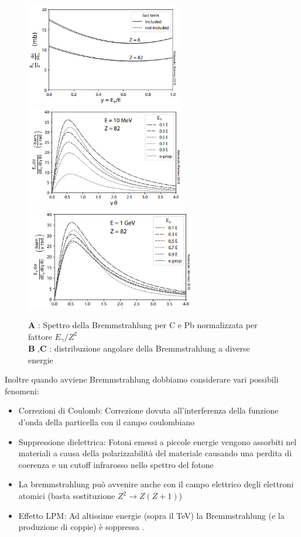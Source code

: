 \begin{figure}[H]
    \centering
    \includegraphics[height=4.5cm,frame]{Chapters/images/Interazione_radiazione_materia/image-20220220135143452.png}
    \includegraphics[height=4.5cm,frame]{Chapters/images/Interazione_radiazione_materia/image-20220220135223580.png}
    \includegraphics[height=4.5cm,frame]{Chapters/images/Interazione_radiazione_materia/image-20220220135322598.png}
    \captionsetup{width=0.9\linewidth}
    \caption{\textbf{A} : Spettro della Bremmstrahlung per C e Pb normalizzata per fattore $E_\gamma/Z^2$ \\ \textbf{B} ,\textbf{C} : distribuzione angolare della Bremmstrahlung a diverse energie}
    \label{fig:}
\end{figure}
Inoltre quando avviene Bremmstrahlung dobbiamo considerare vari possibili fenomeni:
\begin{itemize}
    \item Correzioni di Coulomb: Correzione dovuta all'interferenza della funzione d'onda della particella con il campo coulombiano

\item Suppressione dielettrica: Fotoni emessi a piccole energie vengono assorbiti nel materiali a causa della polarizzabilità del materiale causando una perdita di coerenza e un cutoff infrarosso nello spettro del fotone

\item La bremmstrahlung può avvenire anche con il campo elettrico degli elettroni atomici (basta sostituzione $Z^2 \to Z(Z+1)$)

\item Effetto LPM: Ad altissime energie (sopra il TeV) la Bremmstrahlung (e la produzione di coppie) è soppressa .
\end{itemize}
